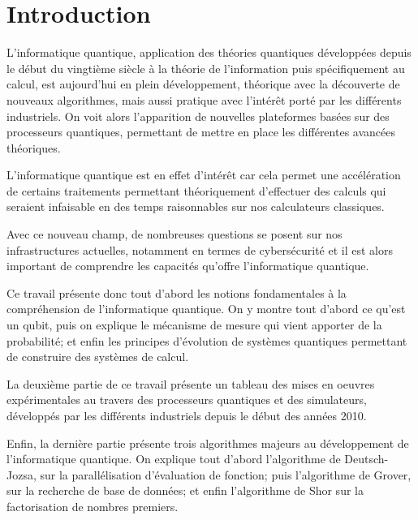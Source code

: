 \chapter{Introduction}

L'informatique quantique, application des théories quantiques développées depuis le début du vingtième siècle à la théorie de l'information puis spécifiquement au calcul, est aujourd'hui en plein développement, théorique avec la découverte de nouveaux algorithmes, mais aussi pratique avec l'intérêt porté par les différents industriels. On voit alors l'apparition de nouvelles plateformes basées sur des processeurs quantiques, permettant de mettre en place les différentes avancées théoriques.

L'informatique quantique est en effet d'intérêt car cela permet une accélération de certains traitements permettant théoriquement d'effectuer des calculs qui seraient infaisable en des temps raisonnables sur nos calculateurs classiques.

Avec ce nouveau champ, de nombreuses questions se posent sur nos infrastructures actuelles, notamment en termes de cybersécurité et il est alors important de comprendre les capacités qu'offre l'informatique quantique.

Ce travail présente donc tout d'abord les notions fondamentales à la compréhension de l'informatique quantique. On y montre tout d'abord ce qu'est un qubit, puis on explique le mécanisme de mesure qui vient apporter de la probabilité; et enfin les principes d'évolution de systèmes quantiques permettant de construire des systèmes de calcul.

La deuxième partie de ce travail présente un tableau des mises en oeuvres expérimentales au travers des processeurs quantiques et des simulateurs, développés par les différents industriels depuis le début des années 2010.

Enfin, la dernière partie présente trois algorithmes majeurs au développement de l'informatique quantique. On explique tout d'abord l'algorithme de Deutsch-Jozsa, sur la parallélisation d'évaluation de fonction; puis l'algorithme de Grover, sur la recherche de base de données; et enfin l'algorithme de Shor sur la factorisation de nombres premiers.